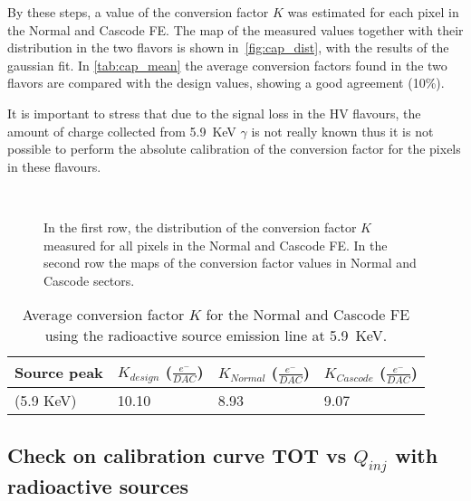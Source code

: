 By these steps, a value of the conversion factor $K$ was estimated for each pixel in the Normal and Cascode FE. The map of the measured values together with their distribution in the two flavors is shown in~\autoref{fig:cap_dist}, with the results of the gaussian fit. In \autoref{tab:cap_mean} the average conversion factors found in the two flavors are compared with the design values, showing a good agreement (10\%).

It is important to stress that due to the signal loss in the HV flavours, the amount of charge collected from \SI{5.9}{KeV} $\gamma$ is not really known thus it is not possible to perform the absolute calibration of the conversion factor for the pixels in these flavours. 

\begin{figure}[h!]
\centering
{}\quad
{}\quad
{}\quad 
{}\\
\caption{In the first row, the distribution of the conversion factor $K$ measured for all pixels in the Normal and Cascode FE. In the second row the maps of the conversion factor values in Normal and Cascode sectors.}
\label{fig:cap_dist}
\end{figure} 


\begin{table}[h!]
\centering
\begin{tabular}{C{2.8cm}|C{2.5cm}|C{2.5cm}|C{2.5cm}}
\hline
Source peak & $K_{design}$ ($\frac{e^{-}}{DAC}$) & $K_{Normal}$ ($\frac{e^{-}}{DAC}$) & $K_{Cascode}$ ($\frac{e^{-}}{DAC}$)\\[2ex]
\hline
\hline
{} (5.9 KeV) & 10.10  & 8.93 & 9.07\\[1ex]
\hline
\hline
\end{tabular}
\caption{Average conversion factor $K$ for the Normal and Cascode FE using the  radioactive source emission line at \SI{5.9}{KeV}.}
\label{tab:cap_mean}
\end{table}


\subsection{Check on calibration curve TOT vs $Q_{inj}$ with radioactive sources}\label{sec:check}

